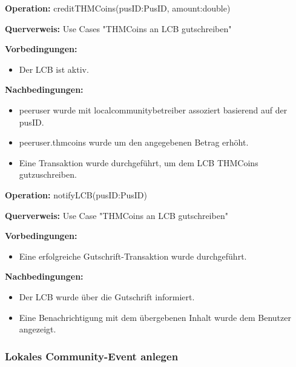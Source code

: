 \documentclass[a4paper,12pt]{article}
\begin{document}
	\begin{contractbox}
		\textbf{Operation:} creditTHMCoins(pusID:PusID, amount:double)
		
		\textbf{Querverweis:} Use Cases "THMCoins an LCB gutschreiben"
		
		\textbf{Vorbedingungen:}
		\begin{itemize}[noitemsep]
			\item Der LCB ist aktiv.
		\end{itemize}
		
		\textbf{Nachbedingungen:}
		\begin{itemize}[noitemsep]
			\item peeruser wurde mit localcommunitybetreiber assoziert basierend auf der pusID.
			\item peeruser.thmcoins wurde um den angegebenen Betrag erhöht. 
			\item Eine Transaktion wurde durchgeführt, um dem LCB THMCoins gutzuschreiben.
		\end{itemize}
	\end{contractbox}
	
	
	\begin{contractbox}
		\textbf{Operation:} notifyLCB(pusID:PusID)
		
		\textbf{Querverweis:} Use Case "THMCoins an LCB gutschreiben"
		
		\textbf{Vorbedingungen:}
		\begin{itemize}[noitemsep]
			\item Eine erfolgreiche Gutschrift-Transaktion wurde durchgeführt.
		\end{itemize}
		
		\textbf{Nachbedingungen:}
		\begin{itemize}[noitemsep]
			\item Der LCB wurde über die Gutschrift informiert.
			\item Eine Benachrichtigung mit dem übergebenen Inhalt wurde dem Benutzer angezeigt.
		\end{itemize}
	\end{contractbox}
	
	\subsubsection{Lokales Community-Event anlegen}
	
\end{document}
